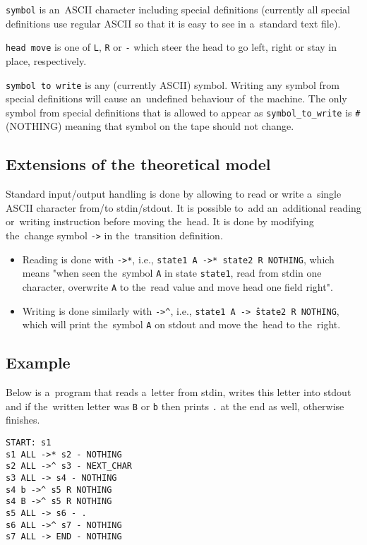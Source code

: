 \documentclass[english,shortabstract,mgr]{iithesis}
\begin{document}
\texttt{symbol} is an~ASCII character including special definitions (currently
all special definitions use regular ASCII so that it is easy to see
in a~standard text file).

\texttt{head move} is one of \texttt{L}, \texttt{R} or \texttt{-} which
steer the head to go left, right or stay in place, respectively.

\texttt{symbol to write} is any (currently ASCII) symbol. Writing any symbol
from special definitions will cause an~undefined behaviour of~the machine. The only symbol
from special definitions that is allowed to appear as \texttt{symbol\_to\_write}
is \texttt{\#} (NOTHING) meaning that symbol on the tape should not change.

\subsection {Extensions of the theoretical model}

Standard input/output handling is done by allowing to read or write a~single
ASCII character from/to stdin/stdout. It is possible to~add an~additional
reading or~writing instruction before moving the~head. It is done by modifying
the~change symbol \texttt{->} in the~transition definition.
\begin{itemize}
  \item Reading is done with \texttt{->*}, i.e., \texttt{state1 A ->* state2 R NOTHING},
        which means "when seen the~symbol \texttt{A} in state \texttt{state1}, read
        from stdin one character, overwrite \texttt{A} to the~read value and move
        head one field right".
  \item Writing is done similarly with \texttt{->\^},
        i.e., \texttt{state1 A ->\^\ state2 R NOTHING}, which will print the~symbol
        \texttt{A} on stdout and move the~head to the~right.
\end{itemize}

\subsection{Example}

Below is a~program that reads a~letter from stdin, writes this letter into
stdout and if the~written letter was \texttt{B} or \texttt{b} then prints
\texttt{.} at the end as well, otherwise finishes.

\begin{verbatim}
START: s1
s1 ALL ->* s2 - NOTHING
s2 ALL ->^ s3 - NEXT_CHAR
s3 ALL -> s4 - NOTHING
s4 b ->^ s5 R NOTHING
s4 B ->^ s5 R NOTHING
s5 ALL -> s6 - .
s6 ALL ->^ s7 - NOTHING
s7 ALL -> END - NOTHING
\end{verbatim}
\end{document}

